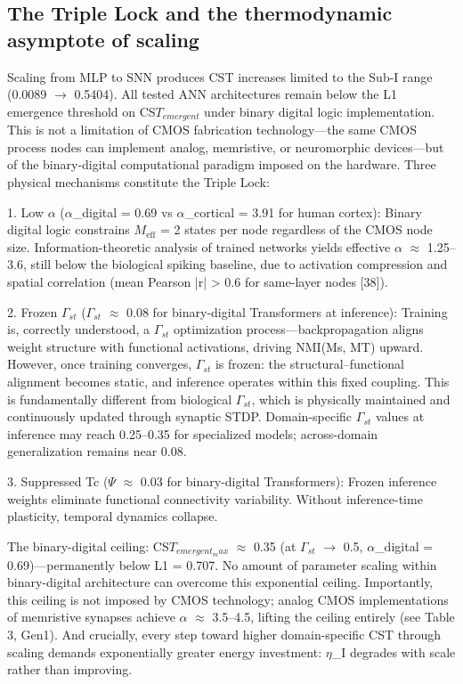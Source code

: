 \documentclass[a4paper,12pt]{article}
\begin{document}
\subsection{The Triple Lock and the thermodynamic asymptote of scaling}

Scaling from MLP to SNN produces CST increases limited to the Sub-I range (0.0089 $\rightarrow$ 0.5404).
All tested ANN architectures remain below the L1 emergence threshold on CS$T_{emergent}$ under binary digital logic implementation.
This is not a limitation of CMOS fabrication technology---the same CMOS process nodes can implement analog, memristive, or neuromorphic devices---but of the binary-digital computational paradigm imposed on the hardware.
Three physical mechanisms constitute the Triple Lock:


1. Low $\alpha$ ($\alpha$_digital = 0.69 vs $\alpha$_cortical = 3.91 for human cortex): Binary digital logic constrains $M_{\text{eff}}$ = 2 states per node regardless of the CMOS node size. Information-theoretic analysis of trained networks yields effective $\alpha$ $\approx$ 1.25--3.6, still below the biological spiking baseline, due to activation compression and spatial correlation (mean Pearson |r| > 0.6 for same-layer nodes [38]).


2.
Frozen $\Gamma_{st}$ ($\Gamma_{st}$ $\approx$ 0.08 for binary-digital Transformers at inference): Training is, correctly understood, a $\Gamma_{st}$ optimization process---backpropagation aligns weight structure with functional activations, driving NMI(Ms, MT) upward.
However, once training converges, $\Gamma_{st}$ is frozen: the structural--functional alignment becomes static, and inference operates within this fixed coupling.
This is fundamentally different from biological $\Gamma_{st}$, which is physically maintained and continuously updated through synaptic STDP.
Domain-specific $\Gamma_{st}$ values at inference may reach 0.25--0.35 for specialized models; across-domain generalization remains near 0.08.


3. Suppressed Tc ($\Psi$ $\approx$ 0.03 for binary-digital Transformers): Frozen inference weights eliminate functional connectivity variability. Without inference-time plasticity, temporal dynamics collapse.


The binary-digital ceiling: CS$T_{emergent_max}$ $\approx$ 0.35 (at $\Gamma_{st}$ $\rightarrow$ 0.5, $\alpha$_digital = 0.69)---permanently below L1 = 0.707.
No amount of parameter scaling within binary-digital architecture can overcome this exponential ceiling.
Importantly, this ceiling is not imposed by CMOS technology; analog CMOS implementations of memristive synapses achieve $\alpha$ $\approx$ 3.5--4.5, lifting the ceiling entirely (see Table 3, Gen1).
And crucially, every step toward higher domain-specific CST through scaling demands exponentially greater energy investment: $\eta$_I degrades with scale rather than improving.
\end{document}
